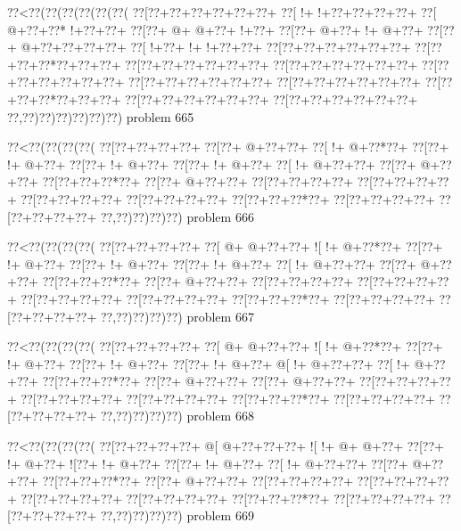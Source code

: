 \vbox{\vbox{\goo
\0??<\0??(\0??(\0??(\0??(\0??(\0??(
\0??[\0??+\0??+\0??+\0??+\0??+\0??+
\0??[\- !+\- !+\0??+\0??+\0??+\0??+
\0??[\- @+\0??+\0??*\- !+\0??+\0??+
\0??[\0??+\- @+\- @+\0??+\- !+\0??+
\0??[\0??+\- @+\0??+\- !+\- @+\0??+
\0??[\0??+\- @+\0??+\0??+\0??+\0??+
\0??[\- !+\0??+\- !+\- !+\0??+\0??+
\0??[\0??+\0??+\0??+\0??+\0??+\0??+
\0??[\0??+\0??+\0??*\0??+\0??+\0??+
\0??[\0??+\0??+\0??+\0??+\0??+\0??+
\0??[\0??+\0??+\0??+\0??+\0??+\0??+
\0??[\0??+\0??+\0??+\0??+\0??+\0??+
\0??[\0??+\0??+\0??+\0??+\0??+\0??+
\0??[\0??+\0??+\0??+\0??+\0??+\0??+
\0??[\0??+\0??+\0??*\0??+\0??+\0??+
\0??[\0??+\0??+\0??+\0??+\0??+\0??+
\0??[\0??+\0??+\0??+\0??+\0??+\0??+
\0??,\0??)\0??)\0??)\0??)\0??)\0??)
}
\hfil problem 665\hfil\break
}

\vbox{\vbox{\goo
\0??<\0??(\0??(\0??(\0??(
\0??[\0??+\0??+\0??+\0??+
\0??[\0??+\- @+\0??+\0??+
\0??[\- !+\- @+\0??*\0??+
\0??[\0??+\- !+\- @+\0??+
\0??[\0??+\- !+\- @+\0??+
\0??[\0??+\- !+\- @+\0??+
\0??[\- !+\- @+\0??+\0??+
\0??[\0??+\- @+\0??+\0??+
\0??[\0??+\0??+\0??*\0??+
\0??[\0??+\- @+\0??+\0??+
\0??[\0??+\0??+\0??+\0??+
\0??[\0??+\0??+\0??+\0??+
\0??[\0??+\0??+\0??+\0??+
\0??[\0??+\0??+\0??+\0??+
\0??[\0??+\0??+\0??*\0??+
\0??[\0??+\0??+\0??+\0??+
\0??[\0??+\0??+\0??+\0??+
\0??,\0??)\0??)\0??)\0??)
}
\hfil problem 666\hfil\break
}

\vbox{\vbox{\goo
\0??<\0??(\0??(\0??(\0??(
\0??[\0??+\0??+\0??+\0??+
\0??[\- @+\- @+\0??+\0??+
\- ![\- !+\- @+\0??*\0??+
\0??[\0??+\- !+\- @+\0??+
\0??[\0??+\- !+\- @+\0??+
\0??[\0??+\- !+\- @+\0??+
\0??[\- !+\- @+\0??+\0??+
\0??[\0??+\- @+\0??+\0??+
\0??[\0??+\0??+\0??*\0??+
\0??[\0??+\- @+\0??+\0??+
\0??[\0??+\0??+\0??+\0??+
\0??[\0??+\0??+\0??+\0??+
\0??[\0??+\0??+\0??+\0??+
\0??[\0??+\0??+\0??+\0??+
\0??[\0??+\0??+\0??*\0??+
\0??[\0??+\0??+\0??+\0??+
\0??[\0??+\0??+\0??+\0??+
\0??,\0??)\0??)\0??)\0??)
}
\hfil problem 667\hfil\break
}

\vbox{\vbox{\goo
\0??<\0??(\0??(\0??(\0??(
\0??[\0??+\0??+\0??+\0??+
\0??[\- @+\- @+\0??+\0??+
\- ![\- !+\- @+\0??*\0??+
\0??[\0??+\- !+\- @+\0??+
\0??[\0??+\- !+\- @+\0??+
\0??[\0??+\- !+\- @+\0??+
\- @[\- !+\- @+\0??+\0??+
\0??[\- !+\- @+\0??+\0??+
\0??[\0??+\0??+\0??*\0??+
\0??[\0??+\- @+\0??+\0??+
\0??[\0??+\- @+\0??+\0??+
\0??[\0??+\0??+\0??+\0??+
\0??[\0??+\0??+\0??+\0??+
\0??[\0??+\0??+\0??+\0??+
\0??[\0??+\0??+\0??*\0??+
\0??[\0??+\0??+\0??+\0??+
\0??[\0??+\0??+\0??+\0??+
\0??,\0??)\0??)\0??)\0??)
}
\hfil problem 668\hfil\break
}

\vbox{\vbox{\goo
\0??<\0??(\0??(\0??(\0??(
\0??[\0??+\0??+\0??+\0??+
\- @[\- @+\0??+\0??+\0??+
\- ![\- !+\- @+\- @+\0??+
\0??[\0??+\- !+\- @+\0??+
\- ![\0??+\- !+\- @+\0??+
\0??[\0??+\- !+\- @+\0??+
\0??[\- !+\- @+\0??+\0??+
\0??[\0??+\- @+\0??+\0??+
\0??[\0??+\0??+\0??*\0??+
\0??[\0??+\- @+\0??+\0??+
\0??[\0??+\0??+\0??+\0??+
\0??[\0??+\0??+\0??+\0??+
\0??[\0??+\0??+\0??+\0??+
\0??[\0??+\0??+\0??+\0??+
\0??[\0??+\0??+\0??*\0??+
\0??[\0??+\0??+\0??+\0??+
\0??[\0??+\0??+\0??+\0??+
\0??,\0??)\0??)\0??)\0??)
}
\hfil problem 669\hfil\break
}

